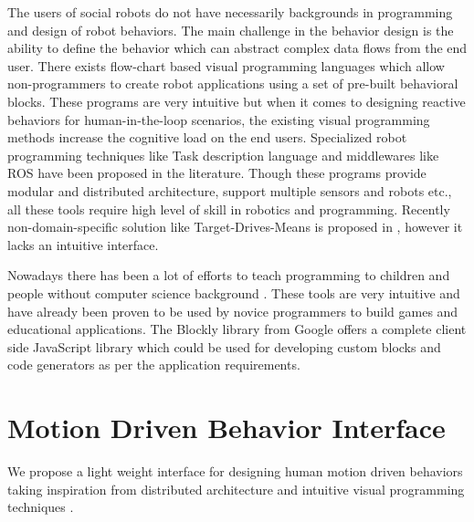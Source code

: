 \documentclass{llncs}
\begin{document}
	The users of social robots do not have necessarily backgrounds in programming and design of robot behaviors. The main challenge in the behavior design is the ability to define the behavior which can abstract complex data flows from the end user. There exists flow-chart based visual programming languages \cite{NaoRobot} which allow non-programmers to create robot applications using a set of pre-built behavioral blocks. These programs are very intuitive but when it comes to designing reactive behaviors for human-in-the-loop scenarios, the existing visual programming methods increase the cognitive load on the end users. Specialized robot programming techniques like Task description language \cite{simmons1998task} and middlewares like ROS \cite{quigley2009ros} have been proposed in the literature. Though these programs provide modular and distributed architecture, support multiple sensors and robots etc., all these tools require high level of skill in robotics and programming. Recently non-domain-specific solution like Target-Drives-Means is proposed in \cite{berenz2014targets}, however it lacks an intuitive interface.
	
	Nowadays there has been a lot of efforts to teach programming to children and people without computer science background \cite{Scratch}\cite{Blockly}. These tools are very intuitive and have already been proven to be used by novice programmers to build games and educational applications. The Blockly library \cite{Blockly} from Google offers a complete client side JavaScript library which could be used for developing custom blocks and code generators as per the application requirements.
\section{Motion Driven Behavior Interface}
We propose a light weight interface for designing human motion driven behaviors taking inspiration from distributed architecture \cite{quigley2009ros} and intuitive visual programming techniques \cite{Blockly}. 
\end{document}
